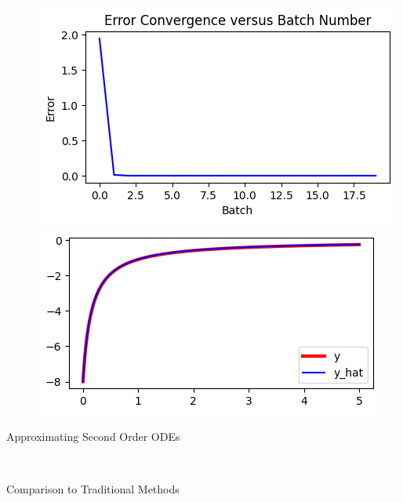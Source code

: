 \documentclass[12pt]{article}
\begin{document}
\begin{description}
\begin{minipage}{\linewidth}
        \centering
        \includegraphics[scale=.5]{images/figure7.png}
        \includegraphics[scale=.5]{images/figure8.png}
    \end{minipage}

    \item[Approximating Second Order ODEs] \hfill \\
    \item[Comparison to Traditional Methods] \hfill \\
\end{description}
\end{document}
